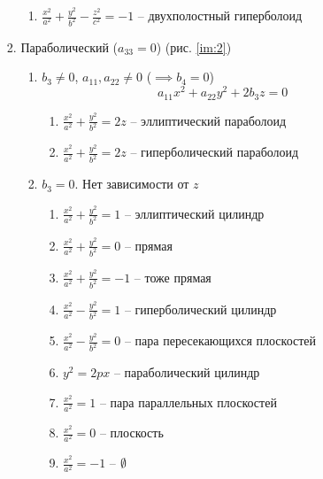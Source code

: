 \begin{algorithm}
\begin{enumerate}
\begin{itemize}
\begin{enumerate}
\begin{enumerate}
                    \item $ \frac{x^2}{a^2} + \frac{y^2}{b^2} - \frac{z^2}{c^2} = -1 $ -- двухполостный гиперболоид
                \end{enumerate}
                \item Параболический ($a_{33} = 0$) (рис. \ref{im:2})
                \begin{enumerate}
                    \item $b_3 \ne 0$, $a_{11}, a_{22} \ne 0$ ($\implies b_4 = 0$)
                    $$ a_{11}x^2 + a_{22}y^2 + 2b_3z = 0 $$
                    \begin{enumerate}
                        \item $\frac{x^2}{a^2} + \frac{y^2}{b^2} = 2z $ -- эллиптический параболоид
                        \item $\frac{x^2}{a^2} + \frac{y^2}{b^2} = 2z $ -- гиперболический параболоид
                    \end{enumerate}
                    \item $b_3 = 0$. Нет зависимости от $z$
                    \begin{enumerate}
                        \item $\frac{x^2}{a^2} + \frac{y^2}{b^2} = 1$ -- эллиптический цилиндр
                        \item $\frac{x^2}{a^2} + \frac{y^2}{b^2} = 0$ -- прямая
                        \item $\frac{x^2}{a^2} + \frac{y^2}{b^2} = -1$ -- тоже прямая
                        \item $\frac{x^2}{a^2} - \frac{y^2}{b^2} = 1$ -- гиперболический цилиндр
                        \item $\frac{x^2}{a^2} - \frac{y^2}{b^2} = 0$ -- пара пересекающихся плоскостей
                        \item $y^2 = 2px$ -- параболический цилиндр
                        \item $\frac{x^2}{a^2} = 1$ -- пара параллельных плоскостей
                        \item $\frac{x^2}{a^2} = 0$ -- плоскость
                        \item $\frac{x^2}{a^2} = -1$ -- $\emptyset$
                    \end{enumerate}
                \end{enumerate}
            \end{enumerate}
        \end{itemize}
    \end{enumerate}
\end{algorithm}

